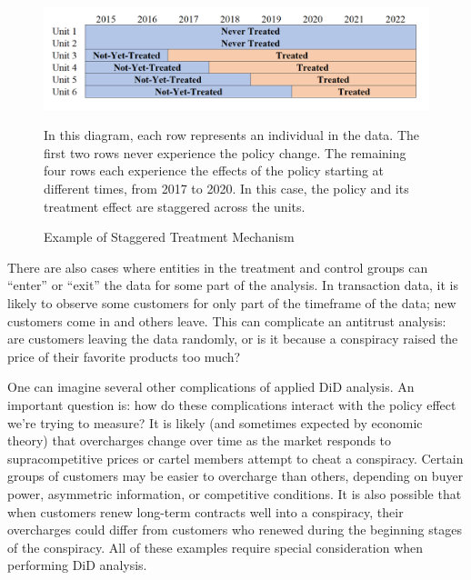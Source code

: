 \documentclass[12pt]{article}
\begin{document}
\begin{figure}[H]
    \centering
    \caption{Example of Staggered Treatment Mechanism}
    \includegraphics[width=5in]{Figures/Visual Staggered Treatment.PNG}
    \label{fig:visual}
    \vspace{2mm}
    \footnotesize \begin{singlespace*}
        \parbox{5.5in}{In this diagram, each row represents an individual in the data. The first two rows never experience the policy change. The remaining four rows each experience the effects of the policy starting at different times, from 2017 to 2020. In this case, the policy and its treatment effect are staggered across the units.}
    \end{singlespace*}
\end{figure}
\noindent There are also cases where entities in the treatment and control groups can “enter” or “exit” the data for some part of the analysis. In transaction data, it is likely to observe some customers for only part of the timeframe of the data; new customers come in and others leave. This can complicate an antitrust analysis: are customers leaving the data randomly, or is it because a conspiracy raised the price of their favorite products too much?

One can imagine several other complications of applied DiD analysis. An important question is: how do these complications interact with the policy effect we’re trying to measure? It is likely (and sometimes expected by economic theory) that overcharges change over time as the market responds to supracompetitive prices or cartel members attempt to cheat a conspiracy. Certain groups of customers may be easier to overcharge than others, depending on buyer power, asymmetric information, or competitive conditions. It is also possible that when customers renew long-term contracts well into a conspiracy, their overcharges could differ from customers who renewed during the beginning stages of the conspiracy. All of these examples require special consideration when performing DiD analysis.
\end{document}
